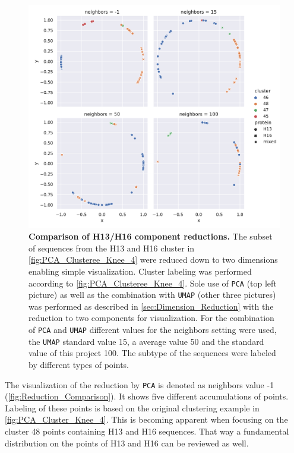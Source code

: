 \begin{figure}[!hbt]
    \centering
    \includegraphics[width=\textwidth]{PCA/Difference_Segment_4_H_metric_cosine.pdf}
    \caption[Comparison of H13/H16 component reductions]{\textbf{Comparison of H13/H16 component reductions.} The subset of sequences from the H13 and H16 cluster in \autoref{fig:PCA_Clusteree_Knee_4} were reduced down to two dimensions enabling simple visualization. Cluster labeling was performed according to \autoref{fig:PCA_Clusteree_Knee_4}. Sole use of \texttt{PCA} (top left picture) as well as the combination with \texttt{UMAP} (other three pictures) was performed as described in \autoref{sec:Dimension_Reduction} with the reduction to two components for visualization. For the combination of \texttt{PCA} and \texttt{UMAP} different values for the neighbors setting were used, the \texttt{UMAP} standard value 15, a average value 50 and the standard value of this project 100. The subtype of the sequences were labeled by different types of points.}
    \label{fig:Reduction_Comparison}
\end{figure}

\vspace{1em}

The visualization of the reduction by \texttt{PCA} is denoted as neighbors value -1 (\autoref{fig:Reduction_Comparison}). It shows five different accumulations of points. Labeling of these points is based on the original clustering example in \autoref{fig:PCA_Cluster_Knee_4}. This is becoming apparent when focusing on the cluster 48 points containing H13 and H16 sequences. That way a fundamental distribution on the points of H13 and H16 can be reviewed as well. 

